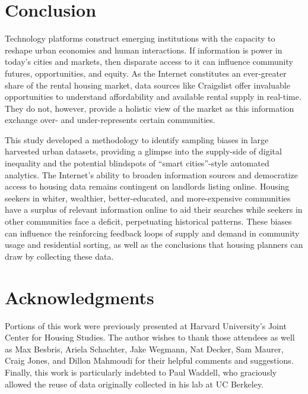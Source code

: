 \documentclass[11pt,letterpaper]{article}
\begin{document}
\section{Conclusion}

Technology platforms construct emerging institutions with the capacity to reshape urban economies and human interactions. If information is power in today's cities and markets, then disparate access to it can influence community futures, opportunities, and equity. As the Internet constitutes an ever-greater share of the rental housing market, data sources like Craigslist offer invaluable opportunities to understand affordability and available rental supply in real-time. They do not, however, provide a holistic view of the market as this information exchange over- and under-represents certain communities. 

This study developed a methodology to identify sampling biases in large harvested urban datasets, providing a glimpse into the supply-side of digital inequality and the potential blindspots of \enquote{smart cities}-style automated analytics. The Internet's ability to broaden information sources and democratize access to housing data remains contingent on landlords listing online. Housing seekers in whiter, wealthier, better-educated, and more-expensive communities have a surplus of relevant information online to aid their searches while seekers in other communities face a deficit, perpetuating historical patterns. These biases can influence the reinforcing feedback loops of supply and demand in community usage and residential sorting, as well as the conclusions that housing planners can draw by collecting these data.
	

\section*{Acknowledgments}

Portions of this work were previously presented at Harvard University's Joint Center for Housing Studies. The author wishes to thank those attendees as well as Max Besbris, Ariela Schachter, Jake Wegmann, Nat Decker, Sam Maurer, Craig Jones, and Dillon Mahmoudi for their helpful comments and suggestions. Finally, this work is particularly indebted to Paul Waddell, who graciously allowed the reuse of data originally collected in his lab at UC Berkeley.


\setlength{\bibsep}{0.00cm plus 0.05cm} %


	
	
\end{document}
